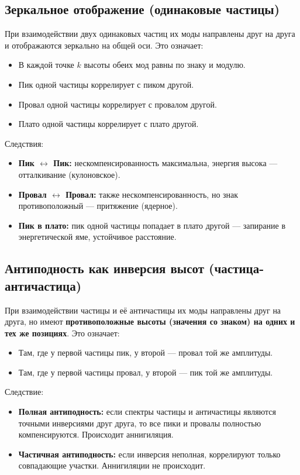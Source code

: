 \documentclass[12pt,a4paper]{article}
\begin{document}
\subsection{Зеркальное отображение (одинаковые частицы)}
При взаимодействии двух одинаковых частиц их моды направлены друг на друга и отображаются зеркально на общей оси. Это означает:

\begin{itemize}
    \item В каждой точке $k$ высоты обеих мод равны по знаку и модулю.
    \item Пик одной частицы коррелирует с пиком другой.
    \item Провал одной частицы коррелирует с провалом другой.
    \item Плато одной частицы коррелирует с плато другой.
\end{itemize}

Следствия:

\begin{itemize}
    \item \textbf{Пик $\leftrightarrow$ Пик:} нескомпенсированность максимальна, энергия высока --- отталкивание (кулоновское).
    \item \textbf{Провал $\leftrightarrow$ Провал:} также нескомпенсированность, но знак противоположный --- притяжение (ядерное).
    \item \textbf{Пик в плато:} пик одной частицы попадает в плато другой --- запирание в энергетической яме, устойчивое расстояние.
\end{itemize}

\subsection{Антиподность как инверсия высот (частица-античастица)}
При взаимодействии частицы и её античастицы их моды направлены друг на друга, но имеют \textbf{противоположные высоты (значения со знаком) на одних и тех же позициях}. Это означает:

\begin{itemize}
    \item Там, где у первой частицы пик, у второй --- провал той же амплитуды.
    \item Там, где у первой частицы провал, у второй --- пик той же амплитуды.
\end{itemize}

Следствие:

\begin{itemize}
    \item \textbf{Полная антиподность:} если спектры частицы и античастицы являются точными инверсиями друг друга, то все пики и провалы полностью компенсируются. Происходит аннигиляция.
    \item \textbf{Частичная антиподность:} если инверсия неполная, коррелируют только совпадающие участки. Аннигиляции не происходит.
\end{itemize}
\end{document}
